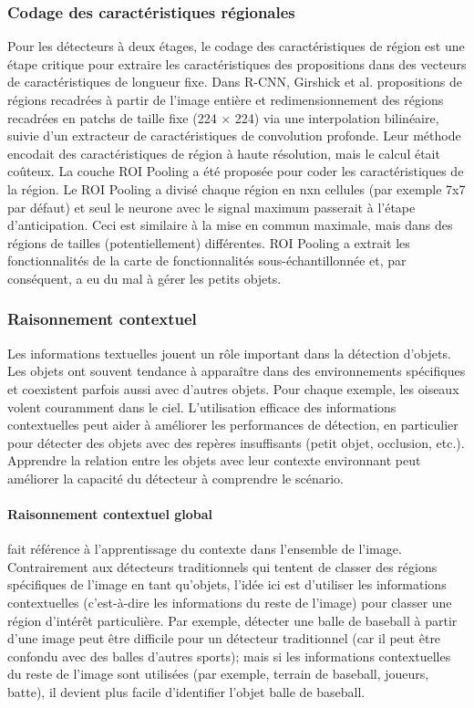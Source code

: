      \subsubsection{Codage des caractéristiques régionales}
     Pour les détecteurs à deux étages, le codage des caractéristiques de région est une étape critique pour extraire les caractéristiques des propositions dans des vecteurs de caractéristiques de longueur fixe. Dans R-CNN, Girshick et al. \cite{rcnn_paper} propositions de régions recadrées à partir de l'image entière et redimensionnement des régions recadrées en patchs de taille fixe (224 × 224) via une interpolation bilinéaire, suivie d'un extracteur de caractéristiques de convolution profonde. Leur méthode encodait des caractéristiques de région à haute résolution, mais le calcul était coûteux. La couche ROI Pooling a été proposée pour coder les caractéristiques de la région. Le ROI Pooling a divisé chaque région en nxn cellules (par exemple 7x7 par défaut) et seul le neurone avec le signal maximum passerait à l'étape d'anticipation. Ceci est similaire à la mise en commun maximale, mais dans des régions de tailles (potentiellement) différentes. ROI Pooling a extrait les fonctionnalités de la carte de fonctionnalités sous-échantillonnée et, par conséquent, a eu du mal à gérer les petits objets.
     
     \subsubsection{Raisonnement contextuel}
     Les informations textuelles jouent un rôle important dans la détection d'objets. Les objets ont souvent tendance à apparaître dans des environnements spécifiques et coexistent parfois aussi avec d'autres objets. Pour chaque exemple, les oiseaux volent couramment dans le ciel. L'utilisation efficace des informations contextuelles peut aider à améliorer les performances de détection, en particulier pour détecter des objets avec des repères insuffisants (petit objet, occlusion, etc.). Apprendre la relation entre les objets avec leur contexte environnant peut améliorer la capacité du détecteur à comprendre le scénario. 
     \paragraph{Raisonnement contextuel global} fait référence à l'apprentissage du contexte dans l'ensemble de l'image. Contrairement aux détecteurs traditionnels qui tentent de classer des régions spécifiques de l'image en tant qu'objets, l'idée ici est d'utiliser les informations contextuelles (c'est-à-dire les informations du reste de l'image) pour classer une région d'intérêt particulière. Par exemple, détecter une balle de baseball à partir d'une image peut être difficile pour un détecteur traditionnel (car il peut être confondu avec des balles d'autres sports); mais si les informations contextuelles du reste de l'image sont utilisées (par exemple, terrain de baseball, joueurs, batte), il devient plus facile d'identifier l'objet balle de baseball.
